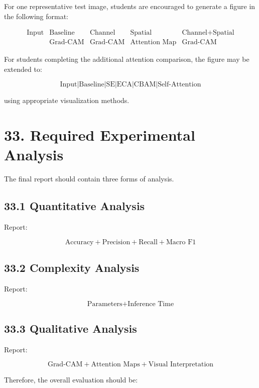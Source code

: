 \documentclass[10pt]{article}
\begin{document}
For one representative test image, students are encouraged to generate a
figure in the following format:

\[
\boxed{
\begin{array}{ccccc}
\text{Input}
&
\text{Baseline}
&
\text{Channel}
&
\text{Spatial}
&
\text{Channel+Spatial}
\\
&
\text{Grad-CAM}
&
\text{Grad-CAM}
&
\text{Attention Map}
&
\text{Grad-CAM}
\end{array}
}
\]

For students completing the additional attention comparison, the figure may
be extended to:

\[
\boxed{
\text{Input}
|
\text{Baseline}
|
\text{SE}
|
\text{ECA}
|
\text{CBAM}
|
\text{Self-Attention}
}
\]

using appropriate visualization methods.

\section*{33. Required Experimental Analysis}

The final report should contain three forms of analysis.

\subsection*{33.1 Quantitative Analysis}

Report:

\[
\boxed{
\text{Accuracy}
+
\text{Precision}
+
\text{Recall}
+
\text{Macro F1}
}
\]

\subsection*{33.2 Complexity Analysis}

Report:

\[
\boxed{
\text{Parameters}
+
\text{Inference Time}
}
\]

\subsection*{33.3 Qualitative Analysis}

Report:

\[
\boxed{
\text{Grad-CAM}
+
\text{Attention Maps}
+
\text{Visual Interpretation}
}
\]

Therefore, the overall evaluation should be:
\end{document}
